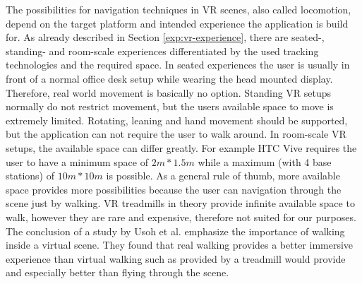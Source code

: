 The possibilities for navigation techniques in VR scenes, also called locomotion, depend on the target platform and intended experience the application is build for. As already described in Section \ref{exp:vr-experience}, there are seated-, standing- and room-scale experiences differentiated by the used tracking technologies and the required space.
In seated experiences the user is usually in front of a normal office desk setup while wearing the head mounted display. Therefore, real world movement is basically no option. 
Standing VR setups normally do not restrict movement, but the users available space to move is extremely limited. Rotating, leaning and hand movement should be supported, but the application can not require the user to walk around.
In room-scale VR setups, the available space can differ greatly. For example HTC Vive requires the user to have a minimum space of $2m * 1.5m$ while a maximum (with 4 base stations) of $10m * 10m$ is possible. As a general rule of thumb, more available space provides more possibilities because the user can navigation through the scene just by walking. 
VR treadmills in theory provide infinite available space to walk, however they are rare and expensive, therefore not suited for our purposes. The conclusion of a study by Usoh et al. \cite{usoh_walking_1999} emphasize the importance of walking inside a virtual scene. They found that real walking provides a better immersive experience than virtual walking such as provided by a treadmill would provide and especially better than flying through the scene. 

